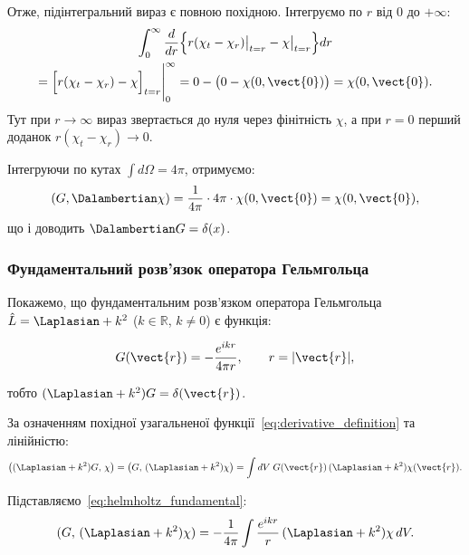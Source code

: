 Отже, підінтегральний вираз є повною похідною. Інтегруємо по \( r \) від \( 0 \) до \( +\infty \):
\begin{multline*}
    \int_0^\infty \frac{d}{dr}\Bigl\{ r(\chi_t - \chi_r)\big|_{t=r} - \chi\big|_{t=r} \Bigr\} dr \\
    = \Bigl[ r(\chi_t - \chi_r) - \chi \Bigr]_{t=r}\Bigg|_0^\infty
    = 0 - \bigl(0 - \chi(0,\vect{0})\bigr) = \chi(0,\vect{0}).
\end{multline*}
Тут при \( r \to \infty \) вираз звертається до нуля через фінітність \( \chi \), а при \( r = 0 \) перший доданок \( r(\chi_t - \chi_r) \to 0 \).

Інтегруючи по кутах \( \int d\Omega = 4\pi \), отримуємо:
\begin{equation*}
    (G, \Dalambertian \chi) = \frac{1}{4\pi} \cdot 4\pi \cdot \chi(0,\vect{0}) = \chi(0,\vect{0}),
\end{equation*}
що і доводить \( \Dalambertian G = \delta(x) \).

\subsubsection{Фундаментальний розв'язок оператора Гельмгольца}

Покажемо, що фундаментальним розв'язком оператора Гельмгольца
\( \hat{L} = \Laplasian + k^2 \) (\( k \in \mathbb{R} \), \( k \neq 0 \)) є функція:

\begin{equation}
    G(\vect{r}) = -\frac{e^{ikr}}{4\pi r}, \qquad r = |\vect{r}|,
    \label{eq:helmholtz_fundamental}
\end{equation}

тобто \( (\Laplasian + k^2) G = \delta(\vect{r}) \).

За означенням похідної узагальненої функції~\eqref{eq:derivative_definition} та лінійністю:
\begin{equation*}
    \bigl((\Laplasian + k^2)G,\, \chi\bigr)
    = \bigl(G,\, (\Laplasian + k^2)\chi\bigr)
    = \int dV\; G(\vect{r})\,(\Laplasian + k^2)\chi(\vect{r}).
\end{equation*}

Підставляємо~\eqref{eq:helmholtz_fundamental}:
\begin{equation*}
    (G,\, (\Laplasian + k^2)\chi)
    = -\frac{1}{4\pi}\int \frac{e^{ikr}}{r}\,(\Laplasian + k^2)\chi\, dV.
\end{equation*}

